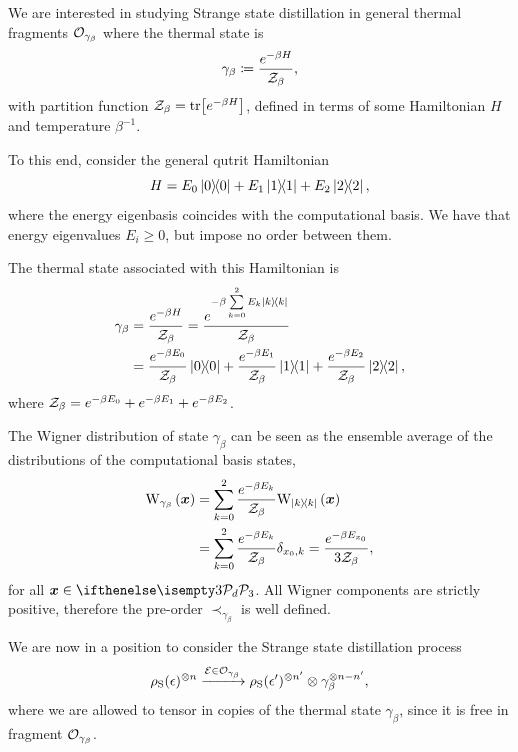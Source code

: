 \documentclass[pra,
aps,
twocolumn,
superscriptaddress,
groupedaddress,
nofootinbib,
reprint
]{revtex4-1}
\begin{document}
We are interested in studying Strange state distillation in general thermal fragments $\mathcal{O}_{\gamma_\beta}$ where the thermal state is
\begin{equation}
	\gamma_\beta \coloneqq \frac{e^{-\beta H}}{\mathcal{Z}_\beta},
\end{equation}
with partition function $\mathcal{Z}_\beta = {\rm{tr}} \big[e^{-\beta H} \big]$, defined in terms of some Hamiltonian $H$ and temperature $\beta^{-1}$.

To this end, consider the general qutrit Hamiltonian
\begin{equation}
	H = E_0 \ketbra{0} + E_1 \ketbra{1} + E_2 \ketbra{2},
\end{equation}
where the energy eigenbasis coincides with the computational basis.
We have that energy eigenvalues $E_i \geq 0$, but impose no order between them.

The thermal state associated with this Hamiltonian is
\begin{align}
	\gamma_\beta &= \frac{e^{-\beta H}}{\mathcal{Z}_\beta} = \frac{e^{-\beta \sum\limits_{k=0}^2 E_k \ketbra{k}}}{\mathcal{Z}_\beta} \\
	&= \frac{e^{-\beta E_0}}{\mathcal{Z}_\beta}\ketbra{0} + \frac{e^{-\beta E_1}}{\mathcal{Z}_\beta}\ketbra{1} + \frac{e^{-\beta E_2}}{\mathcal{Z}_\beta}\ketbra{2},
\end{align}
where $\mathcal{Z}_\beta = e^{-\beta E_0} + e^{-\beta E_1} + e^{-\beta E_2}$.

The Wigner distribution of state $\gamma_\beta$ can be seen as the ensemble average of the distributions of the computational basis states,
\begin{align}
	\W[\bmx]{\gamma_\beta} &= \sum\limits_{k=0}^2 \frac{e^{-\beta E_k}}{\Z_\beta}\W[\bmx]{\ketbra{k}} \\
	&= \sum\limits_{k=0}^2 \frac{e^{-\beta E_k}}{\Z_\beta} \delta_{x_0, k} = \frac{e^{-\beta E_{x_0}}}{3\Z_\beta},
\end{align}
for all $\bmx \in \pd[3]$. 
All Wigner components are strictly positive, therefore the pre-order $\prec_{\gamma_\beta}$ is well defined.

We are now in a position to consider the Strange state distillation process
\begin{equation}\label{eq:msd_thermal}
		\rho_{\rm{S}}(\epsilon)^{\otimes n} \xrightarrow{\mathcal{E} \in \mathcal{O}_{\gamma_\beta}} \rho_{\rm{S}}(\epsilon')^{\otimes n'} \otimes \gamma_\beta^{\otimes n-n'},
\end{equation}
where we are allowed to tensor in copies of the thermal state $\gamma_\beta$, since it is free in fragment $\mathcal{O}_{\gamma_\beta}$.
\end{document}
